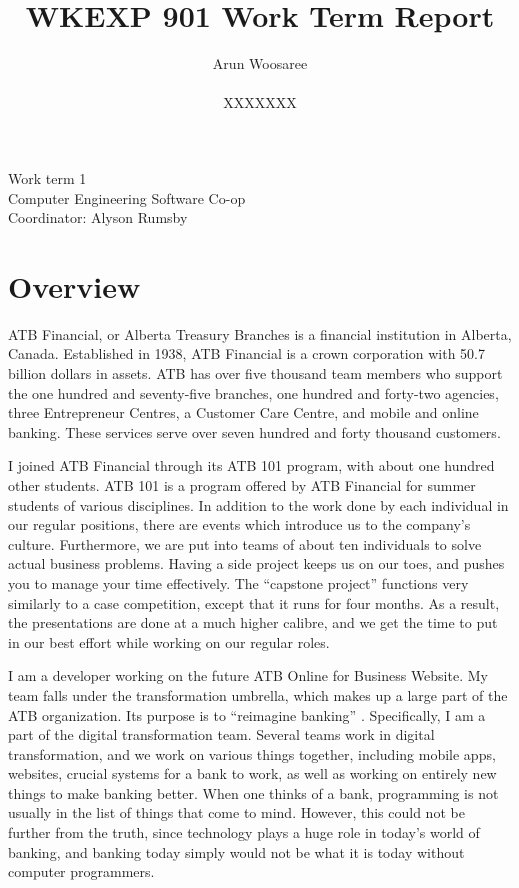 \documentclass[letterpaper,12pt]{article}
\title{WKEXP 901 Work Term Report}
\author{Arun Woosaree \\ \\  XXXXXXX}
\begin{document}
\relax
\begin{titlepage}
 \maketitle
 \thispagestyle{empty} %
 \centering
 \large
 \vspace{1cm}
 Work term 1\\
 \vspace{1cm}
 Computer Engineering Software Co-op \\
 \vspace{1cm}
 Coordinator: Alyson Rumsby
\end{titlepage}

\section{Overview}

ATB Financial, or Alberta Treasury Branches is a financial institution in Alberta, Canada.
Established in 1938, ATB Financial is a crown corporation with 50.7 billion dollars in assets.\cite{annualreport2018}
ATB has over five thousand team members who support the one hundred and seventy-five branches, one hundred and forty-two
agencies, three Entrepreneur Centres, a Customer Care Centre, and mobile and online banking.
These services serve over seven hundred and forty thousand customers. \cite{annualreport2018, annualreport2017}

I joined ATB Financial through its ATB 101 program, with about one hundred other students.
ATB 101 is a program offered by ATB Financial for summer students of various disciplines. 
In addition to the work done by each individual
in our regular positions, there are events which introduce us to the company's culture.
Furthermore, we are put into teams of about ten individuals to solve actual business problems.
Having a side project keeps us on our toes, and pushes you to manage your time effectively.
The ``capstone project'' functions very similarly to a case competition, except that it runs 
for four months. As a result, the presentations are done at a much higher calibre, and we get the time to put in our best effort while working on our regular roles.

I am a developer working on the future ATB Online for Business Website. My team falls under the
transformation umbrella, which
makes up a large part of the ATB organization. Its purpose is to ``reimagine banking'' \cite{atbstory}.
Specifically, I am a part of the digital transformation team. 
Several teams work in digital transformation, and we work on various
things together, including mobile apps, websites, crucial systems for a bank to work, 
as well as working on entirely new things to make banking better. When one thinks of a bank,
programming is not usually in the list of things that come to mind. However, this could not be
further from the truth, since technology
plays a huge role in today's world of banking, and banking today simply would not be what it is
today without computer programmers.
\end{document}
